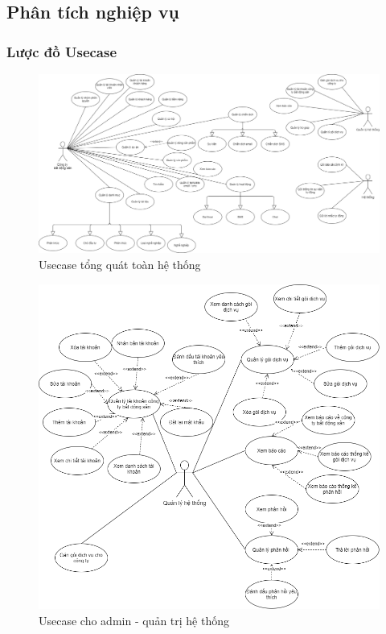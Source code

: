 \documentclass[12pt,a4paper]{article}
\begin{document}
    \subsection{Phân tích nghiệp vụ}

    \subsubsection{Lược đồ Usecase}

    \begin{figure}[H]
        \centering \includegraphics[width=\textwidth]{Img/Usecase/usecase_all.png}
        \vspace{0.5cm}
        \caption{Usecase tổng quát toàn hệ thống}
        \label{usecaseall}
    \end{figure}

    \begin{figure}[H]
        \centering \includegraphics[width=\textwidth]{Img/Usecase/usecase_admin.png}
        \vspace{0.5cm}
        \caption{Usecase cho admin - quản trị hệ thống}
        \label{usecaseadmin}
    \end{figure}
\end{document}
